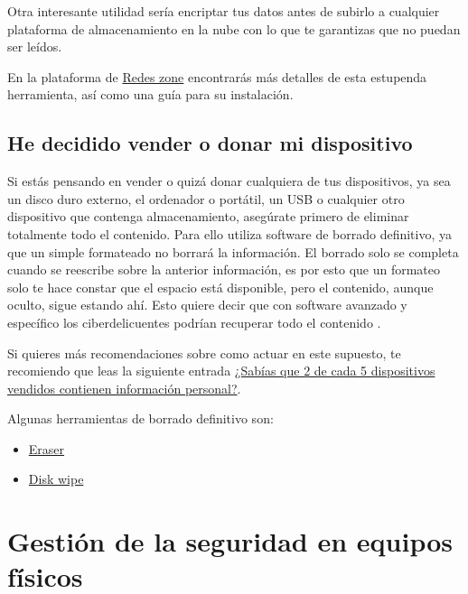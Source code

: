 \documentclass[
  spanish,
  a4paper,
  openany]{book}
\begin{document}
Otra interesante utilidad sería encriptar tus datos antes de subirlo a cualquier plataforma de almacenamiento en la nube con lo que te garantizas que no puedan ser leídos.

En la plataforma de \href{https://www.redeszone.net/tutoriales/seguridad/cryptomator-encriptar-archivos-carpetas/}{Redes zone} encontrarás más detalles de esta estupenda herramienta, así como una guía para su instalación.

\hypertarget{he-decidido-vender-o-donar-mi-dispositivo}{%
\section{He decidido vender o donar mi dispositivo}\label{he-decidido-vender-o-donar-mi-dispositivo}}

Si estás pensando en vender o quizá donar cualquiera de tus dispositivos, ya sea un disco duro externo, el ordenador o portátil, un USB o cualquier otro dispositivo que contenga almacenamiento, asegúrate primero de eliminar totalmente todo el contenido. Para ello utiliza software de borrado definitivo, ya que un simple formateado no borrará la información. El borrado solo se completa cuando se reescribe sobre la anterior información, es por esto que un formateo solo te hace constar que el espacio está disponible, pero el contenido, aunque oculto, sigue estando ahí. Esto quiere decir que con software avanzado y específico los ciberdelicuentes podrían recuperar todo el contenido \citep{XATAKA-borrado-almacenamiento}.

Si quieres más recomendaciones sobre como actuar en este supuesto, te recomiendo que leas la siguiente entrada \href{https://www.osi.es/es/actualidad/blog/2019/10/09/sabias-que-2-de-cada-5-dispositivos-vendidos-contienen-informacion}{¿Sabías que 2 de cada 5 dispositivos vendidos contienen información personal?}.

Algunas herramientas de borrado definitivo son:

\begin{itemize}
\item
  \href{https://eraser.heidi.ie/}{Eraser}
\item
  \href{https://www.diskwipe.org/download.php}{Disk wipe}
\end{itemize}

\hypertarget{gestiuxf3n-de-la-seguridad-en-equipos-fuxedsicos}{%
\chapter{Gestión de la seguridad en equipos físicos}\label{gestiuxf3n-de-la-seguridad-en-equipos-fuxedsicos}}
\end{document}
